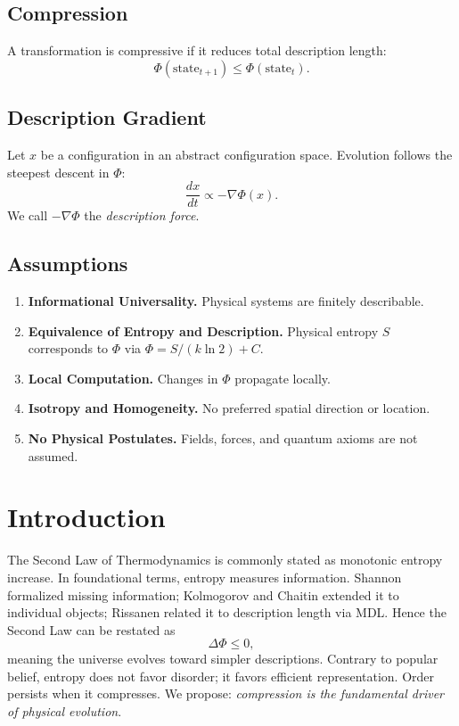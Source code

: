 \documentclass[aps,preprint,onecolumn,longbibliography,nofootinbib]{revtex4-2}
\numberwithin{equation}{section}        %
\begin{document}
\subsection{Compression}
A transformation is compressive if it reduces total description length:
\begin{equation}
\Phi(\text{state}_{t+1}) \le \Phi(\text{state}_{t}). \label{eq:compressive}
\end{equation}

\subsection{Description Gradient}
Let $x$ be a configuration in an abstract configuration space. Evolution follows the steepest descent in $\Phi$:
\begin{equation}
\frac{dx}{dt} \propto -\nabla \Phi(x). \label{eq:desc}
\end{equation}
We call $-\nabla\Phi$ the \emph{description force}.

\subsection*{Assumptions}
\begin{enumerate}
\item \textbf{Informational Universality.} Physical systems are finitely describable.
\item \textbf{Equivalence of Entropy and Description.} Physical entropy $S$ corresponds to $\Phi$ via $\Phi = S/(k\ln 2)+C$.
\item \textbf{Local Computation.} Changes in $\Phi$ propagate locally.
\item \textbf{Isotropy and Homogeneity.} No preferred spatial direction or location.
\item \textbf{No Physical Postulates.} Fields, forces, and quantum axioms are not assumed.
\end{enumerate}

\section{Introduction}
The Second Law of Thermodynamics is commonly stated as monotonic entropy increase. In foundational terms, entropy measures information. Shannon formalized missing information; Kolmogorov and Chaitin extended it to individual objects; Rissanen related it to description length via MDL. Hence the Second Law can be restated as
\begin{equation}
\Delta \Phi \le 0, \label{eq:secondLaw}
\end{equation}
meaning the universe evolves toward simpler descriptions. Contrary to popular belief, entropy does not favor disorder; it favors efficient representation. Order persists when it compresses. We propose: \emph{compression is the fundamental driver of physical evolution}.
\end{document}
